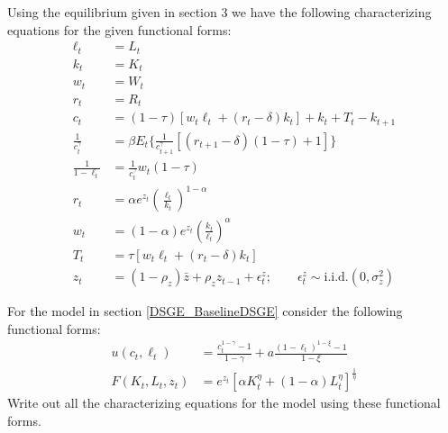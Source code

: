 \documentclass[letterpaper,11pt]{article}
\theoremstyle{definition}
\begin{document}
\begin{spacing}{1.5}
	Using the equilibrium given in section 3 we have the following characterizing equations for the given functional forms:
	\begin{align*}
		\ell_t &= L_t \\
		k_t &= K_t \\
		w_t &= W_t \\
		r_t &= R_t \\
		c_t &= (1-\tau)[w_t\ell_t+(r_t-\delta)k_t]+k_t+T_t-k_{t+1} \\
		\frac{1}{c_t^\gamma} &=  \beta E_t \{\frac{1}{c_{t+1}^\gamma}[(r_{t+1}-\delta)(1-\tau)+1]\} \\
		\frac{1}{1-\ell_t} &= \frac{1}{c_t^\gamma}w_t(1-\tau) \\
		r_t&= \alpha e^{z_t}(\frac{\ell_t}{k_t})^{1-\alpha}\\
		w_t&= (1-\alpha) e^{z_t}(\frac{k_t}{\ell_t})^{\alpha}\\
		T_t &= \tau[w_t\ell_t+(r_t-\delta)k_t] \\
		z_t &= (1-\rho_z)\bar{z}+\rho_zz_{t-1}+\epsilon_t^z; \qquad \epsilon_t^z \sim \text{i.i.d.}(0,\sigma_z^2)
	\end{align*}

	\begin{Exercise} \label{DSGE_HW_CharEq_CES}
		For the model in section \ref{DSGE_BaselineDSGE} consider the following functional forms:
		\begin{equation}\label{DSGE_HW_CharEq_CES_eq01}
		\begin{split}
		u(c_t,\ell_t) & = \frac{c^{1-\gamma}_t -1}{1-\gamma}+ a \frac{(1-\ell_t)^{1-\xi}-1}{1-\xi}      \\
		F(K_t,L_t,z_t) & = e^{z_t}\left[\alpha K^{\eta}_t +(1-\alpha)L^{\eta}_t \right]^{\frac{1}{\eta}}   \nonumber
		\end{split}
		\end{equation}
		Write out all the characterizing equations for the model using these functional forms.
	\end{Exercise}


\end{spacing}
\end{document}

